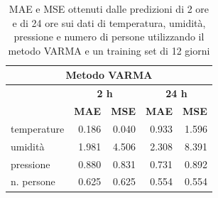\documentclass{article}
\begin{document}
\begin{table}
\centering
\begin{tabular}{l|r|r|r|r}
\multicolumn{5}{c}{{\cellcolor[rgb]{0.875,0.875,0.875}} Metodo VARMA}                                                                                                                        \\ 
\hline
\rowcolor[rgb]{0.753,0.753,0.753}            & \multicolumn{2}{c|}{\textbf{ 2 h}}                                    & \multicolumn{2}{c}{\textbf{24 h }}                                    \\
\rowcolor[rgb]{0.753,0.753,0.753}            & \multicolumn{1}{c|}{\textbf{MAE}} & \multicolumn{1}{c|}{\textbf{MSE}} & \multicolumn{1}{c|}{\textbf{MAE}} & \multicolumn{1}{c}{\textbf{MSE}}  \\ 
\hline
temperature                                  & 0.186        & 0.040        &0.933        & 1.596         \\
\rowcolor[rgb]{0.875,0.875,0.875} umidità    & 1.981                             & 4.506                             & 2.308                             & 8.391                             \\
pressione                                    & 0.880                             & 0.831                             & 0.731                             & 0.892                             \\
\rowcolor[rgb]{0.875,0.875,0.875} n. persone & 0.625                             & 0.625                             & 0.554                             & 0.554                            
\end{tabular}
\caption{MAE e MSE ottenuti dalle predizioni di 2 ore e di 24 ore sui dati di temperatura, umidità, pressione e numero di persone utilizzando il metodo VARMA e un training set di 12 giorni}
\label{tab:var}
\end{table}
\end{document}
